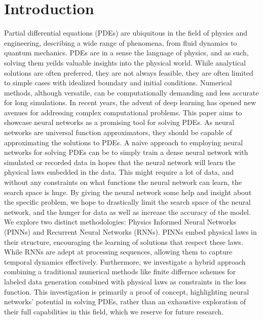 \documentclass[twoside,11pt]{report}
\begin{document}
\section*{Introduction}

    Partial differential equations (PDEs) are ubiquitous in the field of physics and engineering,
    describing a wide range of phenomena, from fluid dynamics to quantum mechanics.
    PDEs are in a sense the language of physics, and as such, solving them yeilds valuable insights into
    the physical world. While analytical solutions are often preferred, they are not always feasible,
    they are often limited to simple cases with idealized boundary and initial conditions. Numerical methods, 
    although versatile, can be computationally 
    demanding and less accurate for long simulations. 
    In recent years, the advent 
    of deep learning has opened new avenues for addressing complex computational problems.
    This paper aims to showcase neural networks as a promising tool for solving PDEs. 
    As neural networks are universal function approximators, they should be 
    capable of approximating the solutions to PDEs. 
    A naive approach to employing neural networks for solving
    PDEs can be to simply train a dense neural network with simulated or recorded data in hopes that
    the neural network will learn the physical laws embedded in the data. This might require a lot of data,
    and without any constraints on what functions the neural network can learn, the search space is huge.
    By giving the neural network some help and insight about the specific
    problem, we hope to drastically limit the search space of the neural network, and the hunger for data
    as well as increase the accuracy of the model.
    We explore two distinct 
    methodologies: Physics Informed Neural Networks (PINNs) and Recurrent Neural Networks (RNNs). 
    PINNs embed physical laws in their structure, encouraging the learning of solutions that respect
    these laws. While RNNs are 
    adept at processing sequences, allowing them to capture temporal dynamics effectively. Furthermore, 
    we investigate a hybrid approach combining a traditional numerical methods like finite
    differnce schemes for labeled data generation combined with physical laws as constraints in the loss function.
    This investigation is primarily a proof of concept, highlighting neural networks' potential 
    in solving PDEs, rather than an exhaustive exploration of their full capabilities in this field, 
    which we reserve for future research.\\
\end{document}
